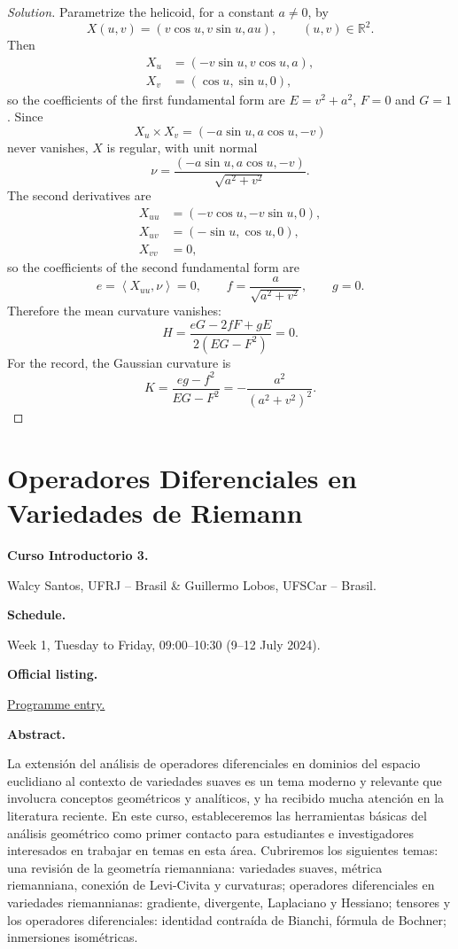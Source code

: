 \begin{proof}[Solution]
Parametrize the helicoid, for a constant
$a \neq 0$, by
$$
X(u,v) = (v\cos u, v\sin u, au),
\qquad (u,v) \in \mathbb{R}^2.
$$
Then
$$
\begin{aligned}
X_u &= (-v\sin u, v\cos u, a), \\
X_v &= (\cos u, \sin u, 0),
\end{aligned}
$$
so the coefficients of the first
fundamental form are
$E = v^2 + a^2$, $F = 0$ and $G = 1$. Since
$$
X_u \times X_v =
(-a\sin u, a\cos u, -v)
$$
never vanishes, $X$ is regular, with unit
normal
$$
\nu = \frac{(-a\sin u, a\cos u, -v)}
{\sqrt{a^2 + v^2}}.
$$
The second derivatives are
$$
\begin{aligned}
X_{uu} &= (-v\cos u, -v\sin u, 0), \\
X_{uv} &= (-\sin u, \cos u, 0), \\
X_{vv} &= 0,
\end{aligned}
$$
so the coefficients of the second
fundamental form are
$$
e = \left\langle{} X_{uu}, \nu
\right\rangle{} = 0,
\qquad
f = \frac{a}{\sqrt{a^2 + v^2}},
\qquad
g = 0.
$$
Therefore the mean curvature vanishes:
$$
H = \frac{eG - 2fF + gE}{2(EG - F^2)}
= 0.
$$
For the record, the Gaussian curvature is
$$
K = \frac{eg - f^2}{EG - F^2}
= -\frac{a^2}{(a^2 + v^2)^2}.
$$
\end{proof}

\section{Operadores Diferenciales en
Variedades de Riemann}
\label{section-santos-lobos-operators}

\medskip\noindent
{\bf Curso Introductorio 3.}

Walcy Santos,
UFRJ -- Brasil \& Guillermo Lobos,
UFSCar -- Brasil.

\medskip\noindent
{\bf Schedule.}

Week 1, Tuesday to Friday, 09:00--10:30
(9--12 July 2024).

\medskip\noindent
{\bf Official listing.}

\href{%
https://naturales.ues.edu.sv/%
ecimpasv2024/introductory-curse-3/}{%
Programme entry.}

\medskip\noindent
{\bf Abstract.}

La extensión del análisis de operadores
diferenciales en dominios del espacio
euclidiano al contexto de variedades suaves
es un tema moderno y relevante que involucra
conceptos geométricos y analíticos, y ha
recibido mucha atención en la literatura
reciente. En este curso, estableceremos las
herramientas básicas del análisis geométrico
como primer contacto para estudiantes e
investigadores interesados en trabajar en
temas en esta área. Cubriremos los siguientes
temas: una revisión de la geometría
riemanniana: variedades suaves, métrica
riemanniana, conexión de Levi-Civita y
curvaturas; operadores diferenciales en
variedades riemannianas: gradiente,
divergente, Laplaciano y Hessiano; tensores y
los operadores diferenciales: identidad
contraída de Bianchi, fórmula de Bochner;
inmersiones isométricas.

